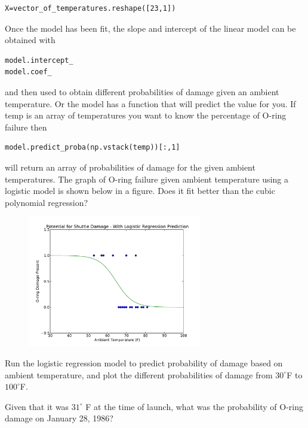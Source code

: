 \begin{verbatim}
X=vector_of_temperatures.reshape([23,1])
\end{verbatim}

Once the model has been fit, the slope and intercept of the linear model can be obtained with
\begin{verbatim}
model.intercept_
model.coef_
\end{verbatim} 
and then used to obtain different probabilities of damage given an ambient temperature.
Or the model has a function that will predict the value for you. If temp is an array of temperatures you want to know the percentage of O-ring failure then
\begin{verbatim}
model.predict_proba(np.vstack(temp))[:,1]
\end{verbatim} 
will return an array of probabilities of damage for the given ambient temperatures. The graph of O-ring failure given ambient temperature using a logistic model is shown below in a figure. Does it fit better than the cubic polynomial regression?  

\begin{figure}[h]
\label{logisticmodel}
\centering
\includegraphics[width=3in]{logreg.pdf}
\end{figure}


\begin{problem}
Run the logistic regression model to predict probability of damage based on ambient temperature, and plot the different probabilities of damage from $30^{\circ} $F to $100^{\circ} $F. 
\end{problem}

\begin{problem}
Given that it was $31^{\circ}$ F at the time of launch, what was the probability of O-ring damage on January 28, 1986?
\end{problem}
